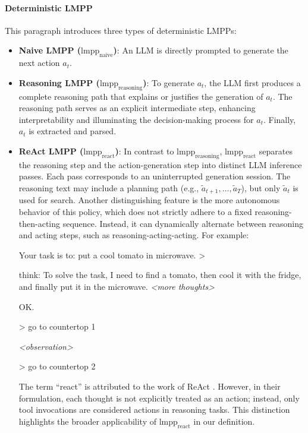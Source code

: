 \paragraph{Deterministic LMPP} 
This paragraph introduces three types of deterministic LMPPs:
\begin{itemize}
    \item \textbf{Naive LMPP ($\text{lmpp}_\text{naive}$)}: An LLM is directly prompted to generate the next action $a_t$. 

    \item \textbf{Reasoning LMPP  ($\text{lmpp}_\text{reasoning}$)}: To generate $a_t$, the LLM first produces a complete reasoning path that explains or justifies the generation of $a_t$. The reasoning path serves as an explicit intermediate step, enhancing interpretability and illuminating the decision-making process for $a_t$. Finally, $a_t$ is extracted and parsed.

    \item \textbf{ReAct LMPP ($\text{lmpp}_\text{react}$)}: In contrast to $\text{lmpp}_\text{reasoning}$, $\text{lmpp}_\text{react}$ separates the reasoning step and the action-generation step into distinct LLM inference passes. Each pass corresponds to an uninterrupted generation session. The reasoning text may include a planning path (e.g., $\tilde{a}_{t+1}, \ldots, \tilde{a}_{T}$), but only $\tilde{a}_{t}$ is used for search. Another distinguishing feature is the more autonomous behavior of this policy, which does not strictly adhere to a fixed reasoning-then-acting sequence. Instead, it can dynamically alternate between reasoning and acting steps, such as reasoning-acting-acting. For example:
    \begin{numberedquote}
        Your task is to: put a cool tomato in microwave. \newline
        >
        \begin{myshadowbox}
        think: To solve the task, I need to find a tomato, then cool it with the fridge, and finally put it in the microwave. 
        \textit{<more thoughts>}
        \end{myshadowbox}
        OK. \newline
        \begin{myshadowbox}
        > go to countertop 1 
        \end{myshadowbox}
        \textit{<observation>}
        \begin{myshadowbox}
        > go to countertop 2 
        \end{myshadowbox}
        \label{quote:lmpr_policy2react}
    \end{numberedquote}
    The term ``react'' is attributed to the work of ReAct \citep{yao2023react}. However, in their formulation, each thought is not explicitly treated as an action; instead, only tool invocations are considered actions in reasoning tasks. This distinction highlights the broader applicability of $\text{lmpp}_\text{react}$ in our definition.
\end{itemize}

